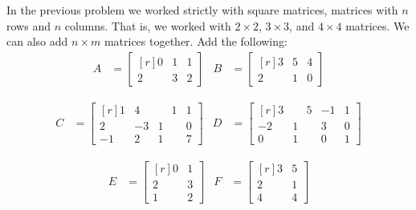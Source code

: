     \begin{problem}
        In the previous problem we worked strictly with square matrices,
        matrices with $n$ rows and $n$ columns. That is, we worked with
        $2\times{2}$, $3\times{3}$, and $4\times{4}$ matrices. We can also
        add $n\times{m}$ matrices together. Add the following:
        \begin{align*}
            A&=
            \begin{bmatrix*}[r]
                0&1&1\\
                2&3&2
            \end{bmatrix*}
            &
            B&=
            \begin{bmatrix*}[r]
                3&5&4\\
                2&1&0
            \end{bmatrix*}
        \end{align*}
        \par\hfill\par
        \begin{align*}
            C&=
            \begin{bmatrix*}[r]
                1&4&\phantom{\minus}1&1\\
                2&\minus{3}&1&0\\
                \minus{1}&2&1&7
            \end{bmatrix*}
            &
            D&=
            \begin{bmatrix*}[r]
                3&\phantom{\minus}5&\minus{1}&1\\
                \minus{2}&1&3&0\\
                0&1&0&1
            \end{bmatrix*}
        \end{align*}
        \par\hfill\par
        \begin{align*}
            E&=
            \begin{bmatrix*}[r]
                0&1\\
                2&3\\
                1&2
            \end{bmatrix*}
            &
            F&=
            \begin{bmatrix*}[r]
                3&5\\
                2&1\\
                4&4
            \end{bmatrix*}
        \end{align*}
    \end{problem}
